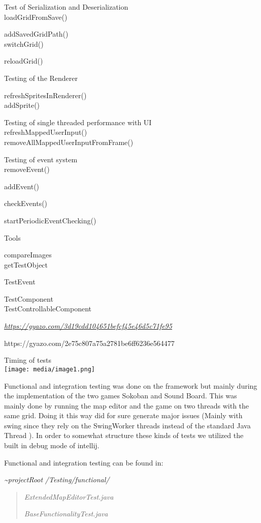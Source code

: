 \documentclass[]{article}
\begin{document}
Test of Serialization and Deserialization\\
loadGridFromSave()

addSavedGridPath()\\
switchGrid()

reloadGrid()

Testing of the Renderer

refreshSpritesInRenderer()\\
addSprite()

Testing of single threaded performance with UI\\
refreshMappedUserInput()\\
removeAllMappedUserInputFromFrame()

Testing of event system\\
removeEvent()

addEvent()

checkEvents()

startPeriodicEventChecking()

Tools

compareImages\\
getTestObject

TestEvent

TestComponent\\
TestControllableComponent

\href{https://gyazo.com/3d19cdd104651befcf45e46d5c71fe95}{\emph{https://gyazo.com/3d19cdd104651befcf45e46d5c71fe95}}

https://gyazo.com/2e75c807a75a2781be6ff6236e564477

Timing of tests\\
\texttt{[image: media/image1.png]}

Functional and integration testing was done on the framework but mainly
during the implementation of the two games Sokoban and Sound Board. This
was mainly done by running the map editor and the game on two threads
with the same grid. Doing it this way did for sure generate major issues
(Mainly with swing since they rely on the SwingWorker threads instead of
the standard Java Thread ). In order to somewhat structure these kinds
of tests we utilized the built in debug mode of intellij.

Functional and integration testing can be found in:

\emph{\textasciitilde{}projectRoot} \emph{/Testing/functional/ }

\begin{quote}
\emph{ExtendedMapEditorTest.java}

\emph{BaseFunctionalityTest.java}
\end{quote}
\end{document}
